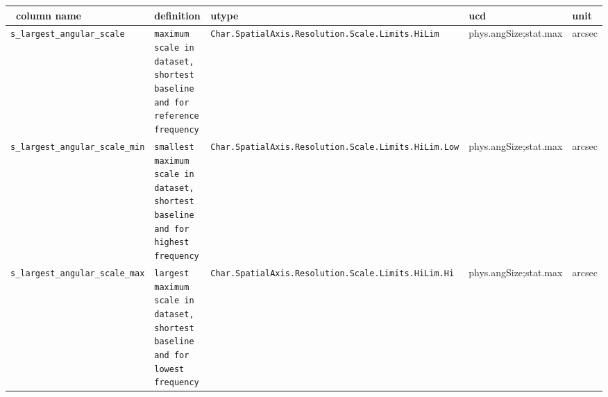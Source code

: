\documentclass[11pt,a4paper]{ivoa}
\begin{document}
\begin{landscape}
\begin{longtable}{l p{4.5cm}| p{4cm}| l l |}
\hline
\
\textbf{column name}&\textbf{definition}&\textbf{utype}&\textbf{ucd}&\textbf{unit}\\
\hline
\texttt{s\_largest\_angular\_scale}&\texttt{maximum scale in dataset, shortest baseline and for reference frequency}&\texttt{Char.SpatialAxis.\newline Resolution.Scale.\newline Limits.HiLim}&{phys.angSize;stat.max}&arcsec \\
\hline
\texttt{s\_largest\_angular\_scale\_min}&\texttt{smallest maximum scale in dataset, shortest baseline and for highest frequency}&\texttt{Char.SpatialAxis.\newline Resolution.Scale.\newline Limits.HiLim.Low}&{phys.angSize;stat.max}&arcsec \\
\hline
\texttt{s\_largest\_angular\_scale\_max}&\texttt{largest maximum scale in dataset, shortest baseline and  for lowest frequency}&\texttt{Char.SpatialAxis.\newline Resolution.Scale.\newline Limits.HiLim.Hi}&{phys.angSize;stat.max}&arcsec \\
\hline


\end{longtable}
\end{landscape}
\end{document}
